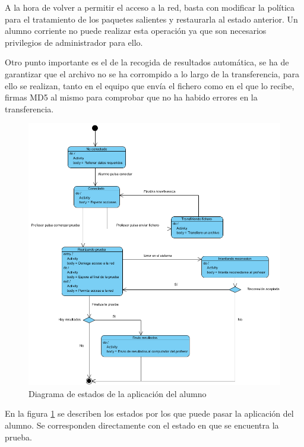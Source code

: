 A la hora de volver a permitir el acceso a la red, basta con modificar la política para el tratamiento de los paquetes salientes y restaurarla al estado anterior. Un alumno corriente no puede realizar esta operación ya que son necesarios privilegios de administrador para ello.
\newline

Otro punto importante es el de la recogida de resultados automática, se ha de garantizar que el archivo no se ha corrompido a lo largo de la transferencia, para ello se realizan, tanto en el equipo que envía el fichero como en el que lo recibe, firmas MD5 al mismo para comprobar que no ha habido errores en la transferencia.


\begin{figure}
    \centering
    \includegraphics[width=12cm]{arquitectura/estadosAlumno}
    \caption{Diagrama de estados de la aplicación del alumno}
    \label{fig:arquitectura:estadosAlumno}
\end{figure}


En la figura \ref{fig:arquitectura:estadosAlumno} se describen los estados por los que puede pasar la aplicación del alumno. Se corresponden directamente con el estado en que se encuentra la prueba. 